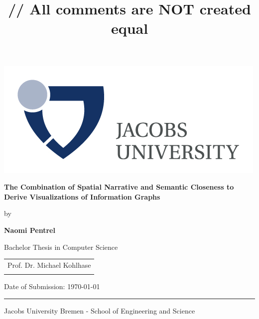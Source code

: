 \documentclass[twoside, 12pt]{article}
\title{\vspace{-15mm}\fontsize{24pt}{10pt}\selectfont\textbf{// All comments are NOT created equal}} %
\begin{document}
\thispagestyle{empty}
\begin{flushright}
    \includegraphics[scale=1.0]{assets/Logo}
  \end{flushright}
  \vspace{20mm}
  \begin{center}
    \huge
    \textbf{The Combination of Spatial Narrative and Semantic Closeness to Derive Visualizations of Information Graphs}
  \end{center}
  \vspace*{4mm}
  \begin{center}
   \Large by
  \end{center}
  \vspace*{4mm}
  \begin{center}
    \Large
    \textbf{Naomi Pentrel}
  \end{center}
  \vspace*{20mm}
  \begin{center}
    \large
    Bachelor Thesis in Computer Science
  \end{center}
  \vfill
  \begin{flushright}
    \large
    \begin{tabular}{l}
      
      \hline
      Prof. Dr. Michael Kohlhase \\
      \\
    \end{tabular}
  \end{flushright}
  \vspace*{8mm}
  \begin{flushleft}
    \large
    Date of Submission: \today \\
    \rule{\textwidth}{1pt}
  \end{flushleft}
  \begin{center}
    \Large Jacobs University Bremen - School of Engineering and Science
  \end{center}
\end{document}
